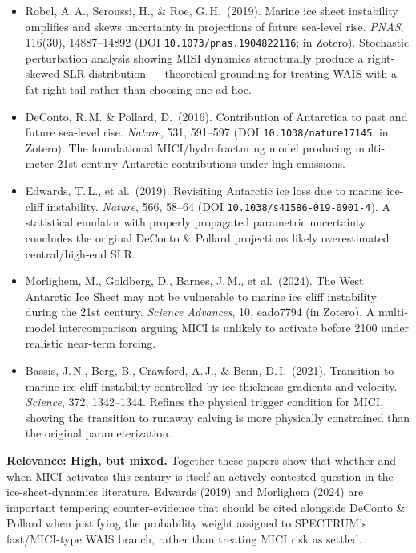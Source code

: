 \documentclass[11pt]{article}
\begin{document}
\begin{itemize}[leftmargin=*]
\item Robel, A.\,A., Seroussi, H., \& Roe, G.\,H.\ (2019). Marine ice sheet
instability amplifies and skews uncertainty in projections of future
sea-level rise. \textit{PNAS}, 116(30), 14887--14892 (DOI
\texttt{10.1073/pnas.1904822116}; in Zotero). Stochastic perturbation
analysis showing MISI dynamics structurally produce a right-skewed SLR
distribution --- theoretical grounding for treating WAIS with a fat right
tail rather than choosing one ad hoc.
\item DeConto, R.\,M. \& Pollard, D.\ (2016). Contribution of Antarctica to
past and future sea-level rise. \textit{Nature}, 531, 591--597 (DOI
\texttt{10.1038/nature17145}; in Zotero). The foundational MICI/hydrofracturing
model producing multi-meter 21st-century Antarctic contributions under high
emissions.
\item Edwards, T.\,L., et al.\ (2019). Revisiting Antarctic ice loss due to
marine ice-cliff instability. \textit{Nature}, 566, 58--64 (DOI
\texttt{10.1038/s41586-019-0901-4}). A statistical emulator with properly
propagated parametric uncertainty concludes the original DeConto \& Pollard
projections likely overestimated central/high-end SLR.
\item Morlighem, M., Goldberg, D., Barnes, J.\,M., et al.\ (2024). The West
Antarctic Ice Sheet may not be vulnerable to marine ice cliff instability
during the 21st century. \textit{Science Advances}, 10, eado7794 (in
Zotero). A multi-model intercomparison arguing MICI is unlikely to activate
before 2100 under realistic near-term forcing.
\item Bassis, J.\,N., Berg, B., Crawford, A.\,J., \& Benn, D.\,I.\ (2021).
Transition to marine ice cliff instability controlled by ice thickness
gradients and velocity. \textit{Science}, 372, 1342--1344. Refines the
physical trigger condition for MICI, showing the transition to runaway
calving is more physically constrained than the original parameterization.
\end{itemize}

\noindent\textbf{Relevance: High, but mixed.} Together these papers show
that whether and when MICI activates this century is itself an actively
contested question in the ice-sheet-dynamics literature. Edwards (2019) and
Morlighem (2024) are important tempering counter-evidence that should be
cited alongside DeConto \& Pollard when justifying the probability weight
assigned to SPECTRUM's fast/MICI-type WAIS branch, rather than treating MICI
risk as settled.
\end{document}
